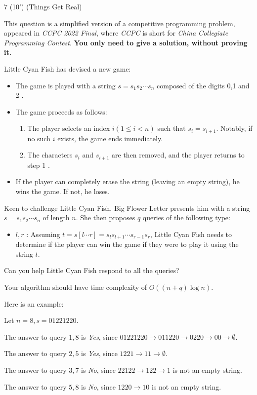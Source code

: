 \begin{question}{7 (10') (Things Get Real)}
    
    This question is a simplified version of a competitive programming problem, appeared in \textit{CCPC 2022 Final}, where \textit{CCPC} is short for \textit{China Collegiate Programming Contest}. \textbf{You only need to give a solution, without proving it. }

    Little Cyan Fish has devised a new game:
    \begin{itemize}
        \item The game is played with a string $s=s_1 s_2 \cdots s_n$ composed of the digits 0,1 and 2 .
        \item The game proceeds as follows:
        \begin{enumerate}
            \item The player selects an index $i(1 \leq i<n)$ such that $s_i=s_{i+1}$. Notably, if no such $i$ exists, the game ends immediately.
            \item  The characters $s_i$ and $s_{i+1}$ are then removed, and the player returns to step 1 .
        \end{enumerate}
        \item If the player can completely erase the string (leaving an empty string), he wins the game. If not, he loses.
    \end{itemize}

Keen to challenge Little Cyan Fish, Big Flower Letter presents him with a string $s=s_1 s_2 \cdots s_n$ of length $n$. She then proposes $q$ queries of the following type:

\begin{itemize}
    \item $l, r$ : Assuming $t=s[l \cdots r]=s_l s_{l+1} \cdots s_{r-1} s_r$, Little Cyan Fish needs to determine if the player can win the game if they were to play it using the string $t$.
\end{itemize}

Can you help Little Cyan Fish respond to all the queries?

Your algorithm should have  time complexity of $O((n+ q) \log n)$.



Here is an example: 

Let $n = 8, s = 01221220$. 


The answer to query $1, 8$ is \textit{Yes}, since $01221220 \to 011220 \to 0220 \to 00 \to \emptyset$.

The answer to query $2, 5$ is \textit{Yes}, since $1221 \to 11 \to \emptyset$.

The answer to query $3, 7$ is \textit{No}, since $22122 \to 122 \to 1$ is not an empty string. 

The answer to query $5, 8$ is \textit{No}, since $1220 \to 10$ is not an empty string. 
\end{question}

